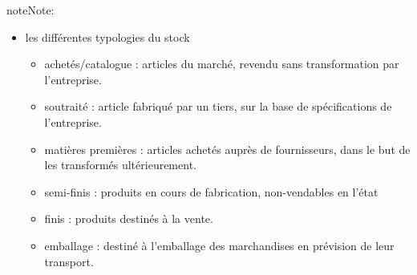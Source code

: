 \documentclass[letterpaper,10pt,french]{sphinxmanual}
\begin{document}
\begin{sphinxadmonition}{note}{Note:}
\begin{itemize}
\begin{itemize}
\item {} 
de synchronisation : lors de l’assemblage d’un groupe, il peut arriver qu’un composant soit en retard. Le stock des autres composants « à l’heure » forment le stock de synchronisation.

\item {} 
spéculatif : acheter plus que strictement nécessaire, afin de bénéficier d’un avantage financier ou stratégique (profiter d’un cours de change favorable, d’un rabais spécial, etc.)

\item {} 
anticipé : produire de manière anticipée afin de lisser la charge de l’entreprise (fabriquer des skis également en été afin d’être prêt à livrer dès le début de l’hiver)

\item {} 
obsolète : produit en fin de vie, peu de chance d’être vendu

\item {} 
WIP : (Work-In-Progress / Work-In-Process) : stocks qui sont actuellement dans le processus de fabrication

\end{itemize}

\item {} 
les différentes typologies du stock
\begin{itemize}
\item {} 
achetés/catalogue : articles du marché, revendu sans transformation par l’entreprise.

\item {} 
soutraité :  article fabriqué par un tiers, sur la base de spécifications de l’entreprise.

\item {} 
matières premières : articles achetés auprès de fournisseurs, dans le but de les transformés ultérieurement.

\item {} 
semi-finis : produits en cours de fabrication, non-vendables en l’état

\item {} 
finis : produits destinés à la vente.

\item {} 
emballage : destiné à l’emballage des marchandises en prévision de leur transport.

\end{itemize}

\end{itemize}


\end{sphinxadmonition}
\end{document}

